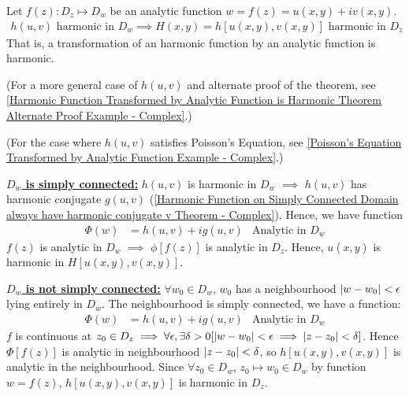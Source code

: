 \documentclass[12pt, english]{book}
\makeatletter
\renewenvironment{proof}[1][\proofname]{\par
	\pushQED{\qed}%
	\normalfont \topsep6\p@\@plus6\p@\relax
	\list{}{%
		\settowidth{\leftmargin}{\itshape\proofname:\hskip\labelsep}%
		\setlength{\labelwidth}{0pt}%
		\setlength{\itemindent}{-\leftmargin}%
		}%
	\item[\hskip\labelsep\itshape#1\@addpunct{:}]\ignorespaces
	}{\popQED\endlist\@endpefalse}
\makeatother
\begin{document}
	\begin{theorem}
		\label{Harmonic Function Transformed by Analytic Function is Harmonic Theorem - Complex}
		Let \(f(z): D_z \mapsto D_w\) be an analytic function \(w = f(z) = u(x,y) + iv(x,y)\).
		\begin{align*}
			h(u, v) \text{ harmonic in } D_w
			\implies H(x,y) = h[u(x,y), v(x,y)] \text{ harmonic in } D_z
		\end{align*}
		That is, a transformation of an harmonic function by an analytic function is harmonic. 
		
		(For a more general case of \(h(u,v)\) and alternate proof of the theorem, see \cref{Harmonic Function Transformed by Analytic Function is Harmonic Theorem Alternate Proof Example - Complex}.)
		
		(For the case where \(h(u,v)\) satisfies Poisson's Equation, see \cref{Poisson's Equation Transformed by Analytic Function Example - Complex}.)
	\end{theorem}
	\begin{proof}
		\textbf{\underline{\(D_w\) is simply connected:}} \newline
		\(h(u,v)\) is harmonic in \(D_w\) \(\implies\) \(h(u,v)\) has harmonic conjugate \(g(u,v)\) (\cref{Harmonic Function on Simply Connected Domain always have harmonic conjugate v Theorem - Complex}). Hence, we have function 
		\begin{align*}
			\Phi(w) &= h(u,v) + ig(u,v) &
			\text{Analytic in } D_w
		\end{align*}
		\(f(z)\) is analytic in \(D_w\) \(\implies\) \(\phi[f(z)]\) is analytic in \(D_z\). Hence, \(u(x,y)\) is harmonic in \(H[u(x,y), v(x,y)]\).
		
		\textbf{\underline{\(D_w\) is not simply connected:}} \newline
		\(\forall w_0 \in D_w\), \(w_0\) has a neighbourhood \(\abs{w-w_0}<\epsilon\) lying entirely in \(D_w\). The neighbourhood is simply connected, we have a function:
		\begin{align*}
			\Phi(w) &= h(u,v) + ig(u,v) &
			\text{Analytic in } D_w
		\end{align*}
		\(f\) is continuous at \(z_0 \in D_z \implies \forall \epsilon, \exists \delta > 0 [\abs{w - w_0}< \epsilon \implies \abs{z-z_0} < \delta] \). Hence \(\Phi[f(z)]\) is analytic in neighbourhood \(\abs{z-z_0} < \delta\), so \(h[u(x,y), v(x,y)]\) is analytic in the neighbourhood. Since \(\forall z_0 \in D_w\), \(z_0 \mapsto w_0 \in D_w\) by function \(w = f(z)\), \(h[u(x,y), v(x,y)]\) is harmonic in \(D_z\).
	\end{proof}
\end{document}
